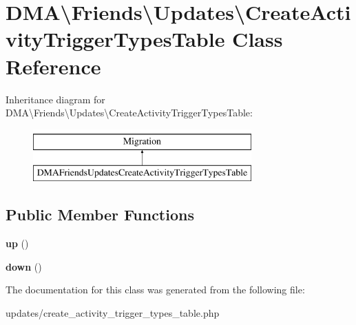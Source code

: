 \hypertarget{classDMA_1_1Friends_1_1Updates_1_1CreateActivityTriggerTypesTable}{\section{D\-M\-A\textbackslash{}Friends\textbackslash{}Updates\textbackslash{}Create\-Activity\-Trigger\-Types\-Table Class Reference}
\label{classDMA_1_1Friends_1_1Updates_1_1CreateActivityTriggerTypesTable}
}
Inheritance diagram for D\-M\-A\textbackslash{}Friends\textbackslash{}Updates\textbackslash{}Create\-Activity\-Trigger\-Types\-Table\-:\begin{figure}[H]
\begin{center}
\leavevmode
\includegraphics[height=2.000000cm]{da/dc2/classDMA_1_1Friends_1_1Updates_1_1CreateActivityTriggerTypesTable}
\end{center}
\end{figure}
\subsection*{Public Member Functions}
\begin{DoxyCompactItemize}
\item 
\hypertarget{classDMA_1_1Friends_1_1Updates_1_1CreateActivityTriggerTypesTable_a92991090948ef30c890d4beacb74c396}{{\bfseries up} ()}\label{classDMA_1_1Friends_1_1Updates_1_1CreateActivityTriggerTypesTable_a92991090948ef30c890d4beacb74c396}

\item 
\hypertarget{classDMA_1_1Friends_1_1Updates_1_1CreateActivityTriggerTypesTable_af2eec40e50403bb0875bea72a26a043c}{{\bfseries down} ()}\label{classDMA_1_1Friends_1_1Updates_1_1CreateActivityTriggerTypesTable_af2eec40e50403bb0875bea72a26a043c}

\end{DoxyCompactItemize}


The documentation for this class was generated from the following file\-:\begin{DoxyCompactItemize}
\item 
updates/create\-\_\-activity\-\_\-trigger\-\_\-types\-\_\-table.\-php\end{DoxyCompactItemize}

